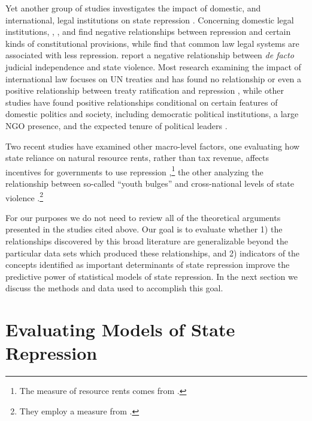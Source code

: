 \documentclass[12pt]{article}
\begin{document}
Yet another group of studies investigates the impact of domestic, and international, legal institutions on state repression \citep{Davenport1996JOP,Cross1999,Hathaway2002,HafnerBurton2005io,Neumayer2005,KeithTatePoe2009,Simmons2009, PowellStaton2009,Hill2010,Lupu2013,Mitchell2013}. Concerning domestic legal institutions, \citet{Davenport1996JOP}, \citet{Cross1999}, and \citet{KeithTatePoe2009} find negative relationships between repression and certain kinds of constitutional provisions, while \citet{Mitchell2013} find that common law legal systems are associated with less repression. \citet{PowellStaton2009} report a negative relationship between {\it de facto} judicial independence and state violence. Most research examining the impact of international law focuses on UN treaties and has found no relationship or even a positive relationship between treaty ratification and repression \citep{Keith1999,Hathaway2002,Hill2010}, while other studies have found positive relationships conditional on certain features of domestic politics and society, including democratic political institutions, a large NGO presence, and the expected tenure of political leaders \citep{Neumayer2005,Simmons2009,ConradRitter2013}. 

Two recent studies have examined other macro-level factors, one evaluating how state reliance on natural resource rents, rather than tax revenue, affects incentives for governments to use repression \citep{DemerittYoung2013},\footnote{The measure of resource rents comes from \citet{Ross2006}.} the other analyzing the relationship between so-called ``youth bulges'' and cross-national levels of state violence \citep{NordaasDavenport2013}.\footnote{They employ a measure from \citet{Urdal2006}.} 

For our purposes we do not need to review all of the theoretical arguments presented in the studies cited above. Our goal is to evaluate whether 1) the relationships discovered by this broad literature are generalizable beyond the particular data sets which produced these relationships, and 2) indicators of the concepts identified as important determinants of state repression improve the predictive power of statistical models of state repression. In the next section we discuss the methods and data used to accomplish this goal.

\section{Evaluating Models of State Repression}
 
\end{document}
